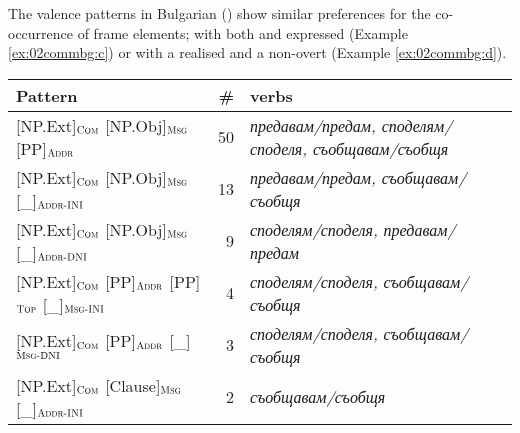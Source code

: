 \documentclass[output=paper,colorlinks,citecolor=brown]{langscibook}
\begin{document}
The valence patterns in Bulgarian () show similar preferences for the co-occurrence of frame elements; with both  and  expressed (Example \ref{ex:02commbg:c}) or with a realised  and a non-overt  (Example \ref{ex:02commbg:d}).

\begin{table}
\begin{tabularx}{\textwidth}{lrQ}
\lsptoprule
         Pattern  & \#  & verbs \\\midrule
{[NP.Ext]}$_{\text{\textsc{Com}}}$ {[NP.Obj]}$_{\text{\textsc{Msg}}}$ {[PP]}$_{\text{\textsc{Addr}}}$ & 50 & \textit{предавам\slash предам, споделям\slash споделя, съобщавам\slash съобщя}\\
{[NP.Ext]}$_{\text{\textsc{Com}}}$ {[NP.Obj]}$_{\text{\textsc{Msg}}}$ {[\_]}$_{\text{\textsc{Addr-INI}}}$ & 13 & \textit{предавам\slash предам, съобщавам\slash съобщя}\\
{[NP.Ext]}$_{\text{\textsc{Com}}}$ {[NP.Obj]}$_{\text{\textsc{Msg}}}$  {[\_]}$_{\text{\textsc{Addr-DNI}}}$ & 9 & \textit{споделям\slash споделя, предавам\slash предам}\\
{[NP.Ext]}$_{\text{\textsc{Com}}}$ {[PP]}$_{\text{\textsc{Addr}}}$ {[PP]}$_{\text{\textsc{Top}}}$   {[\_]}$_{\text{\textsc{Msg-INI}}}$ & 4 & \textit{споделям\slash споделя, съобщавам\slash съобщя}\\
{[NP.Ext]}$_{\text{\textsc{Com}}}$ {[PP]}$_{\text{\textsc{Addr}}}$ {[\_]}$_{\text{\textsc{Msg-DNI}}}$ & 3 & \textit{споделям\slash споделя, съобщавам\slash съобщя}\\
{[NP.Ext]}$_{\text{\textsc{Com}}}$ {[Clause]}$_{\text{\textsc{Msg}}}$  {[\_]}$_{\text{\textsc{Addr-INI}}}$ & 2 & \textit{съобщавам\slash съобщя}\\

\end{tabularx}
\end{table}
\end{document}
